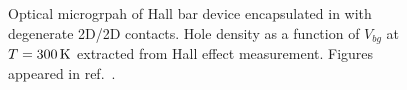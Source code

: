 \begin{figure}[ht]
	\centering
	\qquad
	\caption[Hall effect measurement with 2D/2D contacts to determine capacitance]{\protect{} Optical microgrpah of  Hall bar device encapsulated in \hbn with degenerate 2D/2D contacts. \protect{} Hole density as a function of $V_{bg}$ at $T=300\,\mathrm{K}$ extracted from Hall effect measurement. Figures appeared in ref.~\cite{Chuang_2016}.}
	\label{fig:pWSe2_hall_ben}
\end{figure}